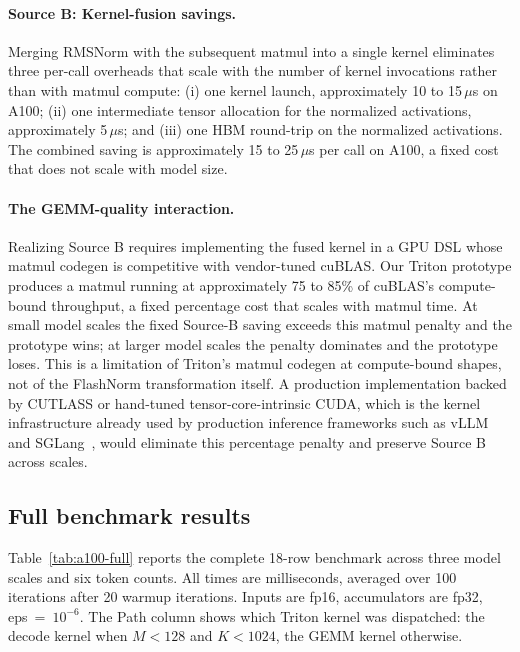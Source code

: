 \documentclass{article}
\begin{document}
\paragraph{Source B: Kernel-fusion savings.} Merging RMSNorm with the subsequent matmul into a single kernel eliminates three per-call overheads that scale with the number of kernel invocations rather than with matmul compute: (i) one kernel launch, approximately 10 to 15\,$\mu$s on A100; (ii) one intermediate tensor allocation for the normalized activations, approximately 5\,$\mu$s; and (iii) one HBM round-trip on the normalized activations. The combined saving is approximately 15 to 25\,$\mu$s per call on A100, a fixed cost that does not scale with model size.

\paragraph{The GEMM-quality interaction.} Realizing Source B requires implementing the fused kernel in a GPU DSL whose matmul codegen is competitive with vendor-tuned cuBLAS. Our Triton prototype produces a matmul running at approximately 75 to 85\% of cuBLAS's compute-bound throughput, a fixed percentage cost that scales with matmul time. At small model scales the fixed Source-B saving exceeds this matmul penalty and the prototype wins; at larger model scales the penalty dominates and the prototype loses. This is a limitation of Triton's matmul codegen at compute-bound shapes, not of the FlashNorm transformation itself. A production implementation backed by CUTLASS or hand-tuned tensor-core-intrinsic CUDA, which is the kernel infrastructure already used by production inference frameworks such as vLLM~\citep{vLLM} and SGLang~\citep{sglang}, would eliminate this percentage penalty and preserve Source B across scales.

\subsection{Full benchmark results}

Table~\ref{tab:a100-full} reports the complete 18-row benchmark across three model scales and six token counts. All times are milliseconds, averaged over 100 iterations after 20 warmup iterations. Inputs are fp16, accumulators are fp32, eps~=~$10^{-6}$. The Path column shows which Triton kernel was dispatched: the decode kernel when $M < 128$ and $K < 1024$, the GEMM kernel otherwise.
\end{document}
